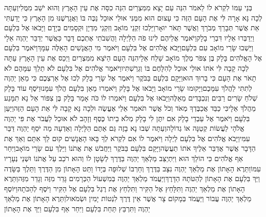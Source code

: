 \documentclass[../main/main.tex]{subfiles}
\begin{document}
\begin{multicols*}{\ncols}
בְּנֵי עַמּוֹ לִקְרֹא לוֹ לֵאמֹר הִנֵּה עַם יָצָא מִמִּצְרַיִם הִנֵּה כִסָּה אֶת עֵין הָאָרֶץ וְהוּא יֹשֵׁב מִמֻּלִי\PreVerseSpace{}וְעַתָּה לְכָה נָּא אָרָה לִּי אֶת הָעָם הַזֶּה כִּי עָצוּם הוּא מִמֶּנִּי אוּלַי אוּכַל נַכֶּה בּוֹ וַאֲגָרְשֶׁנּוּ מִן הָאָרֶץ כִּי יָדַעְתִּי אֵת אֲשֶׁר תְּבָרֵךְ מְבֹרָךְ וַאֲשֶׁר תָּאֹר יוּאָר\PreVerseSpace{}וַיֵּלְכוּ זִקְנֵי מוֹאָב וְזִקְנֵי מִדְיָן וּקְסָמִים בְּיָדָם וַיָּבֹאוּ אֶל בִּלְעָם וַיְדַבְּרוּ אֵלָיו דִּבְרֵי בָלָק\PreVerseSpace{}וַיֹּאמֶר אֲלֵיהֶם לִינוּ פֹה הַלַּיְלָה וַהֲשִׁבֹתִי אֶתְכֶם דָּבָר כַּאֲשֶׁר יְדַבֵּר יַהְוֶה אֵלָי וַיֵּשְׁבוּ שָׂרֵי מוֹאָב עִם בִּלְעָם\PreVerseSpace{}וַיָּבֹא אֱלֹהִים אֶל בִּלְעָם וַיֹּאמֶר מִי הָאֲנָשִׁים הָאֵלֶּה עִמָּךְ\PreVerseSpace{}וַיֹּאמֶר בִּלְעָם אֶל הָאֱלֹהִים בָּלָק בֶּן צִפֹּר מֶלֶךְ מוֹאָב שָׁלַח אֵלָי\PreVerseSpace{}הִנֵּה הָעָם הַיֹּצֵא מִמִּצְרַיִם וַיְכַס אֶת עֵין הָאָרֶץ עַתָּה לְכָה קָבָה לִּי אֹתוֹ אוּלַי אוּכַל לְהִלָּחֶם בּוֹ וְגֵרַשְׁתִּיו\PreVerseSpace{}וַיֹּאמֶר אֱלֹהִים אֶל בִּלְעָם לֹא תֵלֵךְ עִמָּהֶם לֹא תָאֹר אֶת הָעָם כִּי בָרוּךְ הוּא\PreVerseSpace{}וַיָּקָם בִּלְעָם בַּבֹּקֶר וַיֹּאמֶר אֶל שָׂרֵי בָלָק לְכוּ אֶל אַרְצְכֶם כִּי מֵאֵן יַהְוֶה לְתִתִּי לַהֲלֹךְ עִמָּכֶם\PreVerseSpace{}וַיָּקוּמוּ שָׂרֵי מוֹאָב וַיָּבֹאוּ אֶל בָּלָק וַיֹּאמְרוּ מֵאֵן בִּלְעָם הֲלֹךְ עִמָּנוּ\PreVerseSpace{}וַיֹּסֶף עוֹד בָּלָק שְׁלֹחַ שָׂרִים רַבִּים וְנִכְבָּדִים מֵאֵלֶּה\PreVerseSpace{}וַיָּבֹאוּ אֶל בִּלְעָם וַיֹּאמְרוּ לוֹ כֹּה אָמַר בָּלָק בֶּן צִפּוֹר אַל נָא תִמָּנַע מֵהֲלֹךְ אֵלָי\PreVerseSpace{}כִּי כַבֵּד אֲכַבֶּדְךָ מְאֹד וְכֹל אֲשֶׁר תֹּאמַר אֵלַי אֶעֱשֶׂה וּלְכָה נָּא קָבָה לִּי אֵת הָעָם הַזֶּה\PreVerseSpace{}וַיַּעַן בִּלְעָם וַיֹּאמֶר אֶל עַבְדֵי בָלָק אִם יִתֶּן לִי בָלָק מְלֹא בֵיתוֹ כֶּסֶף וְזָהָב לֹא אוּכַל לַעֲבֹר אֶת פִּי יַהְוֶה אֱלֹהָי לַעֲשׂוֹת קְטַנָּה אוֹ גְדוֹלָה\PreVerseSpace{}וְעַתָּה שְׁבוּ נָא בָזֶה גַּם אַתֶּם הַלָּיְלָה וְאֵדְעָה מַה יֹּסֵף יַהְוֶה דַּבֵּר עִמִּי\PreVerseSpace{}וַיָּבֹא אֱלֹהִים אֶל בִּלְעָם לַיְלָה וַיֹּאמֶר לוֹ אִם לִקְרֹא לְךָ בָּאוּ הָאֲנָשִׁים קוּם לֵךְ אִתָּם וְאַךְ אֶת הַדָּבָר אֲשֶׁר אֲדַבֵּר אֵלֶיךָ אֹתוֹ תַעֲשֶׂה\PreVerseSpace{}וַיָּקָם בִּלְעָם בַּבֹּקֶר וַיַּחֲבֹשׁ אֶת אֲתֹנוֹ וַיֵּלֶךְ עִם שָׂרֵי מוֹאָב\PreVerseSpace{}וַיִּחַר אַף אֱלֹהִים כִּי הוֹלֵךְ הוּא וַיִּתְיַצֵּב מַלְאַךְ יַהְוֶה בַּדֶּרֶךְ לְשָׂטָן לוֹ וְהוּא רֹכֵב עַל אֲתֹנוֹ וּשְׁנֵי נְעָרָיו עִמּוֹ\PreVerseSpace{}וַתֵּרֶא הָאָתוֹן אֶת מַלְאַךְ יַהְוֶה נִצָּב בַּדֶּרֶךְ וְחַרְבּוֹ שְׁלוּפָה בְּיָדוֹ וַתֵּט הָאָתוֹן מִן הַדֶּרֶךְ וַתֵּלֶךְ בַּשָּׂדֶה וַיַּךְ בִּלְעָם אֶת הָאָתוֹן לְהַטֹּתָהּ הַדָּרֶךְ\PreVerseSpace{}וַיַּעֲמֹד מַלְאַךְ יַהְוֶה בְּמִשְׁעוֹל הַכְּרָמִים גָּדֵר מִזֶּה וְגָדֵר מִזֶּה\PreVerseSpace{}וַתֵּרֶא הָאָתוֹן אֶת מַלְאַךְ יַהְוֶה וַתִּלָּחֵץ אֶל הַקִּיר וַתִּלְחַץ אֶת רֶגֶל בִּלְעָם אֶל הַקִּיר וַיֹּסֶף לְהַכֹּתָהּ\PreVerseSpace{}וַיּוֹסֶף מַלְאַךְ יַהְוֶה עֲבוֹר וַיַּעֲמֹד בְּמָקוֹם צָר אֲשֶׁר אֵין דֶּרֶךְ לִנְטוֹת יָמִין וּשְׂמֹאול\PreVerseSpace{}וַתֵּרֶא הָאָתוֹן אֶת מַלְאַךְ יַהְוֶה וַתִּרְבַּץ תַּחַת בִּלְעָם וַיִּחַר אַף בִּלְעָם וַיַּךְ אֶת הָאָתוֹן 
\end{multicols*}
\end{document}
